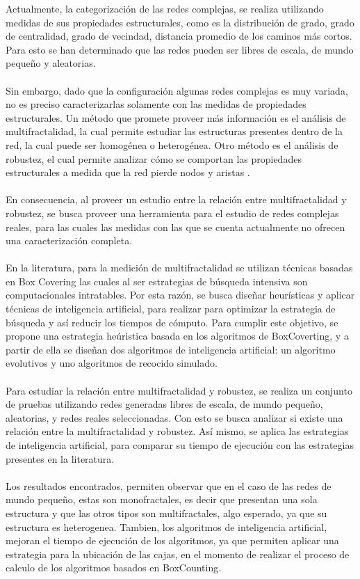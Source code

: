 Actualmente, la categorización de las redes complejas, se realiza utilizando medidas de sus propiedades estructurales, como es la distribución de grado, grado de centralidad, grado de vecindad, distancia promedio de los caminos más cortos. Para esto se han determinado que las redes pueden ser libres de escala, de mundo pequeño y aleatorias\cite{BarabasiNetwork}.
\\\\
Sin embargo, dado que la configuración algunas redes complejas es muy variada, no es preciso caracterizarlas solamente con las medidas de propiedades estructurales. Un método que promete proveer más información es el análisis de multifractalidad, la cual permite estudiar las estructuras presentes dentro de la red, la cual puede ser homogénea o heterogénea\cite{Liu2015}. Otro método es el análisis de robustez, el cual permite analizar cómo se comportan las propiedades estructurales a medida que la red pierde nodos y aristas \cite{Martin-Hernandez2013}.
\\\\
En consecuencia, al proveer un estudio entre la relación entre multifractalidad y robustez, se busca proveer una herramienta para el estudio de redes complejas reales, para las cuales las medidas con las que se cuenta actualmente no ofrecen una caracterización completa.
\\\\
En la literatura, para la medición de multifractalidad se utilizan técnicas basadas en Box Covering\cite{Shuhei2011} las cuales al ser estrategias de búsqueda intensiva son computacionales intratables. Por esta razón, se busca diseñar heurísticas y aplicar técnicas de inteligencia artificial, para realizar para optimizar la estrategia de búsqueda y así reducir los tiempos de cómputo. Para cumplir este objetivo, se propone una estrategia heúristica basada en los algoritmos de BoxCoverting, y a partir de ella se diseñan dos algoritmos de inteligencia artificial: un algoritmo evolutivos y uno algoritmos de recocido simulado.
\\\\
Para estudiar la relación entre multifractalidad y robustez, se realiza un conjunto de pruebas utilizando redes generadas libres de escala, de mundo pequeño, aleatorias, y redes reales seleccionadas. Con esto se busca analizar si existe una relación entre la multifractalidad y robustez. Así mismo, se aplica las estrategias de inteligencia artificial, para comparar su tiempo de ejecución con las estrategias presentes en la literatura.
\\\\
Los resultados encontrados, permiten observar que en el caso de las redes de mundo pequeño, estas son monofractales, es decir que presentan una sola estructura y que las otros tipos son multifractales, algo esperado, ya que su estructura es heterogenea. Tambien, los algoritmos de inteligencia artificial, mejoran el tiempo de ejecución de los algoritmos, ya que permiten aplicar una estrategia para la ubicación de las cajas, en el momento de realizar el proceso de calculo de los algoritmos basados en BoxCounting.


